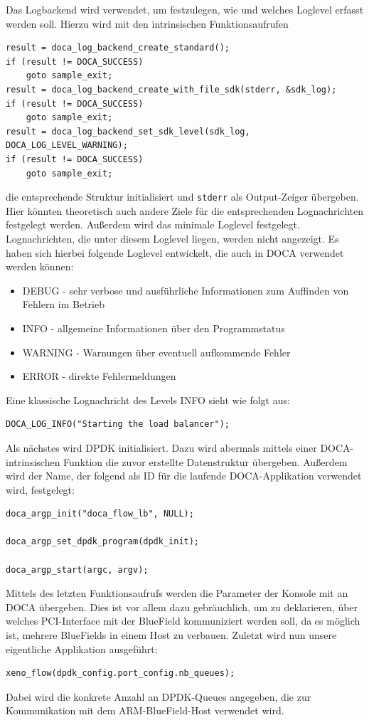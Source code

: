 Das Logbackend wird verwendet, um festzulegen, wie und welches Loglevel erfasst werden soll.
Hierzu wird mit den intrinsischen Funktionsaufrufen
\begin{verbatim}
result = doca_log_backend_create_standard();
if (result != DOCA_SUCCESS)
    goto sample_exit;
result = doca_log_backend_create_with_file_sdk(stderr, &sdk_log);
if (result != DOCA_SUCCESS)
    goto sample_exit;
result = doca_log_backend_set_sdk_level(sdk_log, DOCA_LOG_LEVEL_WARNING);
if (result != DOCA_SUCCESS)
    goto sample_exit;
\end{verbatim}
die entsprechende Struktur initialisiert und \texttt{stderr} als Output-Zeiger übergeben. Hier könnten theoretisch auch andere Ziele für die entsprechenden Lognachrichten festgelegt werden. Außerdem wird das minimale Loglevel festgelegt. Lognachrichten, die unter diesem Loglevel liegen, werden nicht angezeigt. Es haben sich hierbei folgende Loglevel entwickelt, die auch in DOCA verwendet werden können:
\begin{itemize}
    \item DEBUG - sehr verbose und ausführliche Informationen zum Auffinden von Fehlern im Betrieb
    \item INFO - allgemeine Informationen über den Programmstatus
    \item WARNING - Warnungen über eventuell aufkommende Fehler
    \item ERROR - direkte Fehlermeldungen
\end{itemize}
Eine klassische Lognachricht des Levels INFO sieht wie folgt aus:
\begin{verbatim}
DOCA_LOG_INFO("Starting the load balancer");
\end{verbatim}
Als nächstes wird DPDK initialisiert. Dazu wird abermals mittels einer DOCA-intrinsischen Funktion die zuvor erstellte Datenstruktur übergeben. Außerdem wird der Name, der folgend als ID für die laufende DOCA-Applikation verwendet wird, festgelegt:
\begin{verbatim}
doca_argp_init("doca_flow_lb", NULL);

doca_argp_set_dpdk_program(dpdk_init);

doca_argp_start(argc, argv);
\end{verbatim}
Mittels des letzten Funktionsaufrufs werden die Parameter der Konsole mit an DOCA übergeben. Dies ist vor allem dazu gebräuchlich, um zu deklarieren, über welches PCI-Interface mit der BlueField kommuniziert werden soll, da es möglich ist, mehrere BlueFields in einem Host zu verbauen.
Zuletzt wird nun unsere eigentliche Applikation ausgeführt:
\begin{verbatim}
xeno_flow(dpdk_config.port_config.nb_queues);
\end{verbatim}
Dabei wird die konkrete Anzahl an DPDK-Queues angegeben, die zur Kommunikation mit dem ARM-BlueField-Host verwendet wird. 
